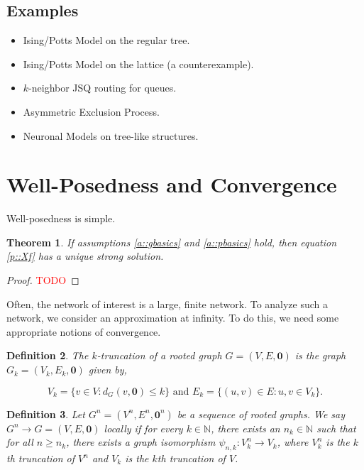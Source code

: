 \documentclass[12pt]{article}
\newcommand{\mb}{\mathbb}
\newcommand{\ra}{\rightarrow}
\newcommand{\te}{\text}
\newcommand{\tr}{\textcolor{red}}
\renewcommand{\root}{\mathbf{0}}
\newcommand{\indx}[1]{^{#1}}						%
\newcommand{\trnc}[1]{_{#1}}						%
\newtheorem{thms}{Theorem}[section]
\newtheorem{defn}[thms]{Definition}
\begin{document}
\subsection{Examples}
\label{e::not}

\begin{itemize}
\item Ising/Potts Model on the regular tree.

\item Ising/Potts Model on the lattice (a counterexample).

\item \(k\)-neighbor JSQ routing for queues.

\item Asymmetric Exclusion Process.

\item Neuronal Models on tree-like structures.
\end{itemize}

\section{Well-Posedness and Convergence}
\label{WP}

Well-posedness is simple.

\begin{thms}
If assumptions \ref{a::gbasics} and \ref{a::pbasics} hold, then equation \eqref{p::Xf} has a unique strong solution.
\label{WP::WP}
\end{thms}
\begin{proof}
\tr{TODO}
\end{proof}

Often, the network of interest is a large, finite network. To analyze such a network, we consider an approximation at infinity. To do this, we need some appropriate notions of convergence.

\begin{defn}
The \(k\)-truncation of a rooted graph \(G = (V,E,\root)\) is the graph \(G\trnc{k}=(V\trnc{k},E\trnc{k},\root)\) given by,

\[V\trnc{k} = \{v \in V: d_G(v,\root) \leq k\} \te{ and } E\trnc{k} = \{(u,v) \in E: u,v \in V\trnc{k}\}.\]
\label{WP::trunc}
\end{defn}

\begin{defn}
Let \(G\indx{n} = (V\indx{n},E\indx{n},\root\indx{n})\) be a sequence of rooted graphs. We say \(G\indx{n} \ra G = (V,E,\root)\) locally if for every \(k\in \mb{N}\), there exists an \(n_k \in \mb{N}\) such that for all \(n \geq n_k\), there exists a graph isomorphism \(\psi_{n,k}: V\indx{n}\trnc{k} \ra V\trnc{k}\), where \(V\indx{n}\trnc{k}\) is the \(k\)th truncation of \(V\indx{n}\) and \(V\trnc{k}\) is the \(k\)th truncation of \(V\).
\label{WP::locconv}
\end{defn}
\end{document}
